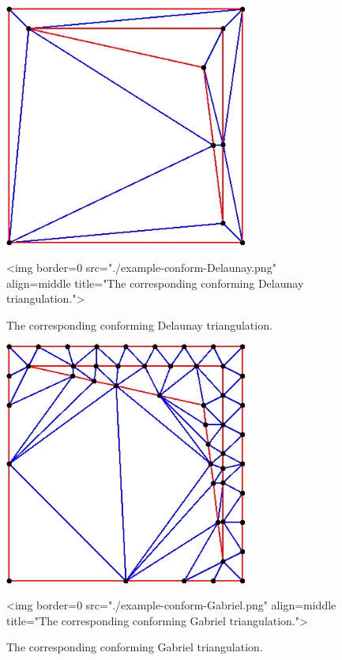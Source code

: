 \begin{figure}[htbp]
\begin{center}
\begin{ccTexOnly}
\includegraphics[width=8cm]{Mesh_2/example-conform-Delaunay}
\end{ccTexOnly}
\begin{ccHtmlOnly}
<img border=0 src="./example-conform-Delaunay.png"
     align=middle title="The corresponding conforming Delaunay triangulation.">
\end{ccHtmlOnly}
\end{center}
\caption{The corresponding conforming Delaunay triangulation.}
\label{Conform-example-conform-Delaunay}
\end{figure}

\begin{figure}[htbp]
\begin{center}
\begin{ccTexOnly}
\includegraphics[width=8cm]{Mesh_2/example-conform-Gabriel}
\end{ccTexOnly}
\begin{ccHtmlOnly}
<img border=0 src="./example-conform-Gabriel.png"
     align=middle title="The corresponding conforming Gabriel triangulation.">
\end{ccHtmlOnly}
\end{center}
\caption{The corresponding conforming Gabriel triangulation.}
\label{Conform-example-conform-Gabriel}
\end{figure}

